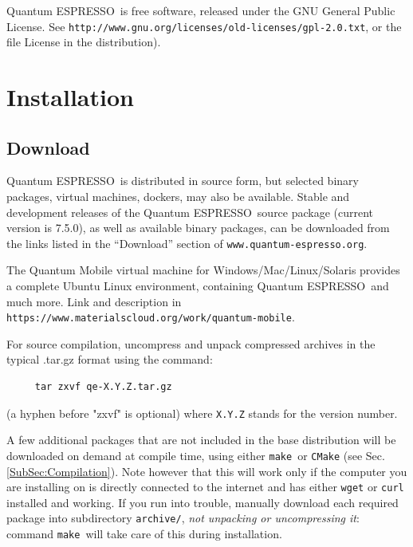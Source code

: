 \documentclass[12pt,a4paper]{article}
\def\version{7.5.0}
\def\qe{{\sc Quantum ESPRESSO}}
\def\make{\texttt{make}}
\begin{document}
\qe\ is free software, released under the
GNU General Public License. See
\texttt{http://www.gnu.org/licenses/old-licenses/gpl-2.0.txt},
or the file License in the distribution).


\section{Installation}

\subsection{Download}
\label{SubSec:Download}

\qe\ is distributed in source form, but selected binary packages,
virtual machines, dockers, may also be available.
Stable and development releases of the \qe\ source package
(current version is \version), as well as available binary
packages, can be downloaded from the links listed in the
``Download'' section of \texttt{www.quantum-espresso.org}.

The Quantum Mobile virtual machine for Windows/Mac/Linux/Solaris
provides a complete Ubuntu Linux environment, containing \qe\ and
much more. Link and description in
\texttt{https://www.materialscloud.org/work/quantum-mobile}.

For source compilation, uncompress and unpack compressed archives
in the typical .tar.gz format using the command:
\begin{verbatim}
     tar zxvf qe-X.Y.Z.tar.gz
\end{verbatim}
(a hyphen before "zxvf" is optional) where \texttt{X.Y.Z} stands for the
version number.

A few additional packages that are not included in the base distribution
will be downloaded on demand at compile time, using either \make\ or
\texttt{CMake} (see Sec.\ref{SubSec:Compilation}).
Note however that this will work only if the computer you are
installing on is directly connected to the internet and has
either \texttt{wget} or \texttt{curl} installed and working.
If you run into trouble, manually download each required package
into subdirectory \texttt{archive/}, {\em not unpacking or
uncompressing it}:
command \make\ will take care of this during installation.
\end{document}
